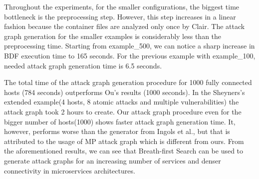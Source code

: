 Throughout the experiments, for the smaller configurations, the biggest time bottleneck is the preprocessing step. However, this step increases in a linear fashion because the container files are analyzed only once by Clair. The attack graph generation for the smaller examples is considerably less than the preprocessing time. Starting from example\_500, we can notice a sharp increase in BDF execution time to 165 seconds. For the previous example with example\_100, needed attack graph generation time is 6.5 seconds.

The total time of the attack graph generation procedure for 1000 fully connected hosts (784 seconds) outperforms Ou's results (1000 seconds). In the Sheyners's extended example(4 hosts, 8 atomic attacks and multiple vulnerabilities) the attack graph took 2 hours to create. Our attack graph procedure even for the bigger number of hosts(1000) shows faster attack graph generation time. It, however, performs worse than the generator from Ingols et al., but that is attributed to the usage of MP attack graph which is different from ours. From the aforementioned results, we can see that Breath-first Search can be used to generate attack graphs for an increasing number of services and denser connectivity in microservices architectures. 
